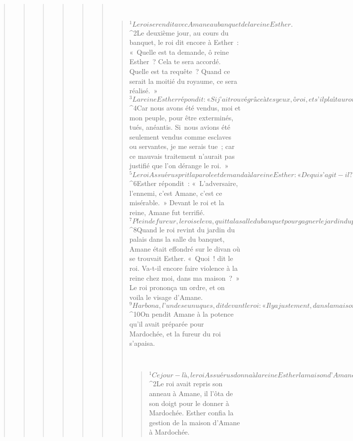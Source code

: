 \begin{verse}
\begin{verse}
\begin{verse}
\begin{verse}
\begin{verse}
\begin{verse}
         
      \bchapter{}
      \begin{verse}
${}^{1}Le roi se rendit avec Amane au banquet de la reine Esther. 
${}^{2}Le deuxième jour, au cours du banquet, le roi dit encore à Esther : « Quelle est ta demande, ô reine Esther ? Cela te sera accordé. Quelle est ta requête ? Quand ce serait la moitié du royaume, ce sera réalisé. » 
${}^{3}La reine Esther répondit : « Si j’ai trouvé grâce à tes yeux, ô roi, et s’il plaît au roi, accorde-moi la vie – voilà ma demande. Accorde la vie à mon peuple – voilà ma requête. 
${}^{4}Car nous avons été vendus, moi et mon peuple, pour être exterminés, tués, anéantis. Si nous avions été seulement vendus comme esclaves ou servantes, je me serais tue ; car ce mauvais traitement n’aurait pas justifié que l’on dérange le roi. »
${}^{5}Le roi Assuérus prit la parole et demanda à la reine Esther : « De qui s’agit-il ? Quel est l’homme qui a osé agir ainsi ? » 
${}^{6}Esther répondit : « L’adversaire, l’ennemi, c’est Amane, c’est ce misérable. »
      Devant le roi et la reine, Amane fut terrifié. 
${}^{7}Plein de fureur, le roi se leva, quitta la salle du banquet pour gagner le jardin du palais, tandis qu’Amane se tenait près de la reine Esther et lui demandait grâce pour sa vie, voyant bien que le roi avait décidé sa perte.
${}^{8}Quand le roi revint du jardin du palais dans la salle du banquet, Amane était effondré sur le divan où se trouvait Esther. « Quoi ! dit le roi. Va-t-il encore faire violence à la reine chez moi, dans ma maison ? » Le roi prononça un ordre, et on voila le visage d’Amane. 
${}^{9}Harbona, l’un des eunuques, dit devant le roi : « Il y a justement, dans la maison d’Amane, une potence de cinquante coudées, qu’Amane avait dressée pour Mardochée, l’homme qui a parlé pour le bien du roi. » Le roi dit : « Qu’on l’y pende ! » 
${}^{10}On pendit Amane à la potence qu’il avait préparée pour Mardochée, et la fureur du roi s’apaisa.
       
      
         
      \bchapter{}
      \begin{verse}
${}^{1}Ce jour-là, le roi Assuérus donna à la reine Esther la maison d’Amane, l’adversaire des Juifs. Mardochée se présenta au roi, à qui Esther avait révélé ce qu’il était pour elle. 
${}^{2}Le roi avait repris son anneau à Amane, il l’ôta de son doigt pour le donner à Mardochée. Esther confia la gestion de la maison d’Amane à Mardochée.
      

\end{verse}
\end{verse}
\end{verse}
\end{verse}
\end{verse}
\end{verse}
\end{verse}
\end{verse}
